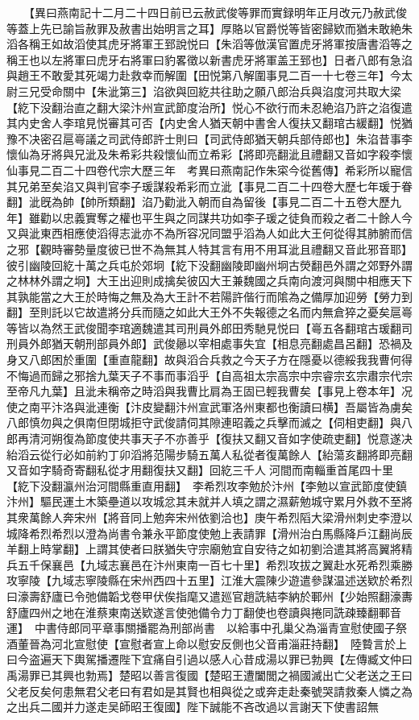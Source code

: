 　　【異曰燕南記十二月二十四日前已云赦武俊等罪而實録明年正月改元乃赦武俊等蓋上先已諭旨赦罪及赦書出始明言之耳】厚賂以官爵悦等皆密歸欵而猶未敢絶朱滔各稱王如故滔使其虎牙將軍王郅說悦曰【朱滔等倣漢官置虎牙將軍按唐書滔等之稱王也以左將軍曰虎牙右將軍曰豹畧徵以新書虎牙將軍盖王郅也】日者八郎有急淊與趙王不敢愛其死竭力赴救幸而解圍【田悦第八解圍事見二百一十七卷三年】今太尉三兄受命關中【朱泚第三】淊欲與回紇共往助之願八郎治兵與淊度河共取大梁【紇下没翻治直之翻大梁汴州宣武節度治所】悦心不欲行而未忍絶淊乃許之淊復遣其内史舍人李琯見悦審其可否【内史舍人猶天朝中書舍人復扶又翻琯古緩翻】悦猶豫不决密召扈㠋議之司武侍郎許士則曰【司武侍郎猶天朝兵部侍郎也】朱淊昔事李懷仙為牙將與兄泚及朱希彩共殺懷仙而立希彩【將即亮翻泚且禮翻又音如字殺李懷仙事見二百二十四卷代宗大歷三年　考異曰燕南記作朱寀今從舊傳】希彩所以寵信其兄弟至矣淊又與判官李子瑗謀殺希彩而立泚【事見二百二十四卷大歷七年瑗于眷翻】泚旣為帥【帥所類翻】淊乃勸泚入朝而自為留後【事見二百二十五卷大歷九年】雖勸以忠義實奪之權也平生與之同謀共功如李子瑗之徒負而殺之者二十餘人今又與泚東西相應使滔得志泚亦不為所容况同盟乎滔為人如此大王何從得其肺腑而信之邪【觀時審勢量度彼已世不為無其人特其言有用不用耳泚且禮翻又音此邪音耶】彼引幽陵回紇十萬之兵屯於郊坰【紇下没翻幽陵即幽州坰古熒翻邑外謂之郊野外謂之林林外謂之坰】大王出迎則成擒矣彼囚大王兼魏國之兵南向渡河與關中相應天下其孰能當之大王於時悔之無及為大王計不若陽許偕行而隂為之備厚加迎勞【勞力到翻】至則託以它故遣將分兵而隨之如此大王外不失報德之名而内無倉猝之憂矣扈㠋等皆以為然王武俊聞李琯適魏遣其司刑員外郎田秀馳見悦曰【㠋五各翻琯古瑗翻司刑員外郎猶天朝刑部員外郎】武俊曏以宰相處事失宜【相息亮翻處昌呂翻】恐禍及身又八郎困於重圍【重直龍翻】故與滔合兵救之今天子方在隱憂以德綏我我曹何得不悔過而歸之邪捨九葉天子不事而事滔乎【自高祖太宗高宗中宗睿宗玄宗肅宗代宗至帝凡九葉】且泚未稱帝之時滔與我曹比肩為王固已輕我曹矣【事見上卷本年】况使之南平汴洛與泚連衡【汴皮變翻汴州宣武軍洛州東都也衡讀曰横】吾屬皆為虜矣八郎慎勿與之俱南但閉城拒守武俊請伺其隙連昭義之兵擊而滅之【伺相吏翻】與八郎再清河朔復為節度使共事天子不亦善乎【復扶又翻又音如字使疏吏翻】悦意遂决紿滔云從行必如前約丁卯滔將范陽步騎五萬人私從者復萬餘人【紿蕩亥翻將即亮翻又音如字騎奇寄翻私從才用翻復扶又翻】回紇三千人河間而南輜重首尾四十里【紇下没翻瀛州治河間縣重直用翻】　李希烈攻李勉於汴州【李勉以宣武節度使鎮汴州】驅民運土木築壘道以攻城忿其未就并人填之謂之濕薪勉城守累月外救不至將其衆萬餘人奔宋州【將音同上勉奔宋州依劉洽也】庚午希烈䧟大梁滑州刺史李澄以城降希烈希烈以澄為尚書令兼永平節度使勉上表請罪【滑州治白馬縣降戶江翻尚辰羊翻上時掌翻】上謂其使者曰朕猶失守宗廟勉宜自安待之如初劉洽遣其將高翼將精兵五千保襄邑【九域志襄邑在汴州東南一百七十里】希烈攻拔之翼赴水死希烈乘勝攻寧陵【九域志寧陵縣在宋州西四十五里】江淮大震陳少遊遣參謀温述送欵於希烈曰濠壽舒廬已令弛備韜戈卷甲伏俟指麾又遣廵官趙詵結李納於鄆州【少始照翻濠夀舒廬四州之地在淮蔡東南送欵遂言使弛備令力丁翻使也卷讀與捲同詵疎臻翻鄆音運】　中書侍郎同平章事關播罷為刑部尚書　以給事中孔巢父為淄青宣慰使國子祭酒董晉為河北宣慰使【宣慰者宣上命以慰安反側也父音甫淄莊持翻】　陸䞇言於上曰今盗遍天下輿駕播遷陛下宜痛自引過以感人心昔成湯以罪已勃興【左傳臧文仲曰禹湯罪已其興也勃焉】楚昭以善言復國【楚昭王遭闔閭之禍國滅出亡父老送之王曰父老反矣何患無君父老曰有君如是其賢也相與從之或奔走赴秦號哭請救秦人憐之為之出兵二國并力遂走吴師昭王復國】陛下誠能不吝改過以言謝天下使書詔無